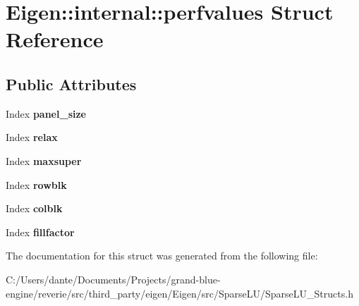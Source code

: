 \hypertarget{struct_eigen_1_1internal_1_1perfvalues}{}\section{Eigen\+::internal\+::perfvalues Struct Reference}
\label{struct_eigen_1_1internal_1_1perfvalues}
\subsection*{Public Attributes}
\begin{DoxyCompactItemize}
\item 
\mbox{\label{struct_eigen_1_1internal_1_1perfvalues_a2748521392b14bbcc12d4ec8ad15ddf1}} 
Index {\bfseries panel\+\_\+size}
\item 
\mbox{\label{struct_eigen_1_1internal_1_1perfvalues_a216549b3c18a3a3cbb3a59cc9e90b668}} 
Index {\bfseries relax}
\item 
\mbox{\label{struct_eigen_1_1internal_1_1perfvalues_a28c5f327f26ed6071d55d31b8bd13c7f}} 
Index {\bfseries maxsuper}
\item 
\mbox{\label{struct_eigen_1_1internal_1_1perfvalues_a34a7f1ca383030043ac9d45eb5ea80b1}} 
Index {\bfseries rowblk}
\item 
\mbox{\label{struct_eigen_1_1internal_1_1perfvalues_a5b84264675f896dadf7bd23bd165ca71}} 
Index {\bfseries colblk}
\item 
\mbox{\label{struct_eigen_1_1internal_1_1perfvalues_a753e3fe218963805700187736fc3af0e}} 
Index {\bfseries fillfactor}
\end{DoxyCompactItemize}


The documentation for this struct was generated from the following file\+:\begin{DoxyCompactItemize}
\item 
C\+:/\+Users/dante/\+Documents/\+Projects/grand-\/blue-\/engine/reverie/src/third\+\_\+party/eigen/\+Eigen/src/\+Sparse\+L\+U/Sparse\+L\+U\+\_\+\+Structs.\+h\end{DoxyCompactItemize}
